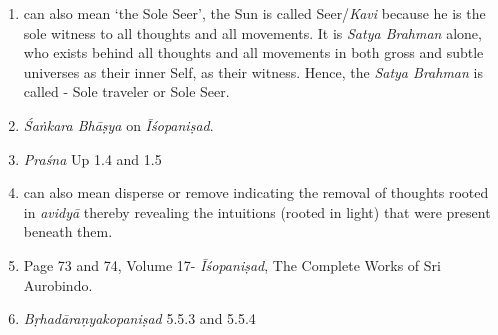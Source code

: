 \begin{enumerate}
\itemsep=0pt
\item
   can also mean `the Sole Seer', the Sun is called Seer/\emph{Kavi} because he is the sole witness to all thoughts and all movements. It is \emph{Satya Brahman} alone, who exists behind all thoughts and all movements in both gross and subtle universes as their inner Self, as their witness. Hence, the \emph{Satya Brahman} is called - Sole traveler or Sole Seer.
\item
  \emph{Śaṅkara Bhāṣya} on \emph{Īśopaniṣad}.
\item
  \emph{Praśna} Up 1.4 and 1.5
\item
   can also mean disperse or remove indicating the removal of thoughts rooted in \emph{avidyā} thereby revealing the intuitions (rooted in light) that were present beneath them.
\item
  Page 73 and 74, Volume 17- \emph{Īśopaniṣad}, The Complete Works of Sri Aurobindo.
\item
  \emph{Bṛhadāraṇyakopaniṣad} 5.5.3 and 5.5.4
\end{enumerate}


